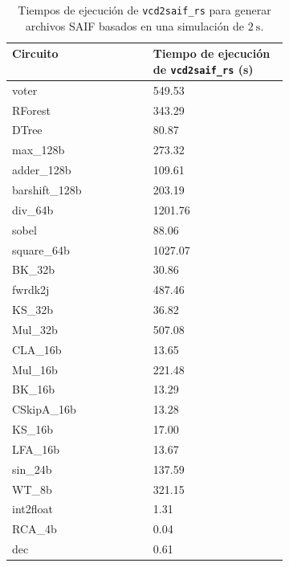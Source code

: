 \begin{table}[htb]
  \centering
  \caption{Tiempos de ejecución de \texttt{vcd2saif\_rs} para generar archivos SAIF basados en una simulación de $\SI{2}{\second}$.}
  \label{tab:vcd2saif_rs}

  \begin{tabular}{M{0.2\linewidth}M{0.2\linewidth}}
    \toprule
    Circuito  & Tiempo de ejecución de \texttt{vcd2saif\_rs} (\si{\second}) \\
    \midrule
    voter & 549.53 \\
    RForest & 343.29 \\
    DTree & 80.87 \\
    max\_128b & 273.32 \\
    adder\_128b & 109.61 \\
    barshift\_128b & 203.19 \\
    div\_64b & 1201.76 \\
    sobel & 88.06 \\
    square\_64b & 1027.07 \\
    BK\_32b & 30.86 \\
    fwrdk2j & 487.46 \\
    KS\_32b & 36.82 \\
    Mul\_32b & 507.08 \\
    CLA\_16b & 13.65 \\
    Mul\_16b & 221.48 \\
    BK\_16b & 13.29 \\
    CSkipA\_16b & 13.28 \\
    KS\_16b & 17.00 \\
    LFA\_16b & 13.67 \\
    sin\_24b & 137.59 \\
    WT\_8b & 321.15 \\
    int2float & 1.31 \\
    RCA\_4b & 0.04 \\
    dec & 0.61 \\
    \bottomrule
  \end{tabular}
\end{table}

\clearpage

